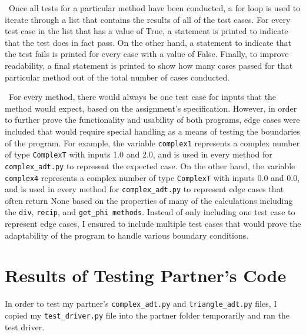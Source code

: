 \documentclass[12pt]{article}
\begin{document}
\newpage

~\newline\noindent Once all tests for a particular method have been conducted, a for loop is used to iterate through a list that contains the results of all of the test cases. For every test case in the list that has a value of True, a statement is printed to indicate that the test does in fact pass. On the other hand, a statement to indicate that the test fails is printed for every case with a value of False.  Finally, to improve readability, a final statement is printed to show how many cases passed for that particular method out of the total number of cases conducted.

~\newline\noindent For every method, there would always be one test case for inputs that the method would expect, based on the assignment’s specification. However, in order to further prove the functionality and usability of both programs, edge cases were included that would require special handling as a means of testing the boundaries of the program. For example, the variable \verb |complex1| represents a complex number of type \verb |ComplexT| with inputs 1.0 and 2.0, and is used in every method for \verb |complex_adt.py| to represent the expected case. On the other hand, the variable \verb |complex4| represents a complex number of type \verb |ComplexT| with inputs 0.0 and 0.0, and is used in every method for \verb |complex_adt.py| to represent edge cases that often return None based on the properties of many of the calculations including the \verb |div|, \verb |recip|, and \verb |get_phi methods|. Instead of only including one test case to represent edge cases, I ensured to include multiple test cases that would prove the adaptability of the program to handle various boundary conditions. 

\newpage

\section{Results of Testing Partner's Code}

In order to test my partner’s \verb |complex_adt.py| and \verb |triangle_adt.py| files, I copied my \verb |test_driver.py| file into the partner folder temporarily and ran the test driver. 
\end{document}
